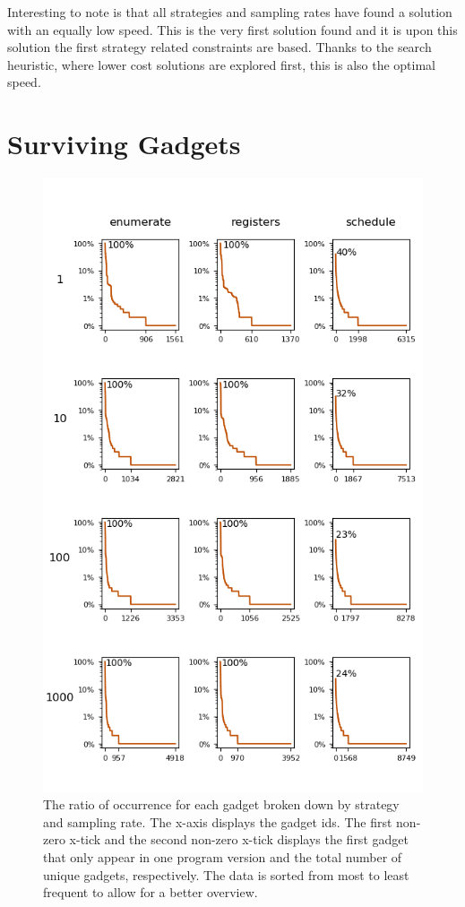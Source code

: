 Interesting to note is that all strategies and sampling rates have found a solution with
an equally low speed. This is the very first solution found and it is upon this solution
the first strategy related constraints are based. Thanks to the search heuristic, where
lower cost solutions are explored first, this is also the optimal speed.

\section{Surviving Gadgets}

\begin{figure}[htp]
	\centering
	\includegraphics[width=\textwidth,height=\textheight]{results/figures/gadgets}
	\caption{The ratio of occurrence for each gadget broken down by strategy and sampling rate.
The x-axis displays the gadget ids. The first non-zero x-tick and the second non-zero x-tick
displays the first gadget that only appear in one program version and the total number
of unique gadgets, respectively. The data is sorted from most to least frequent to allow
for a better overview.}
	\label{fig:gadgets}
\end{figure}

